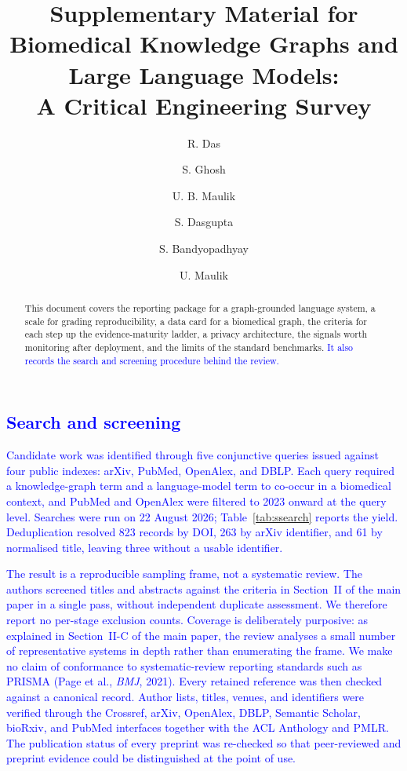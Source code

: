 \documentclass[10pt,a4paper]{article}
\title{Supplementary Material for\\[4pt]
\large Biomedical Knowledge Graphs and Large Language Models:\\A Critical Engineering Survey}
\author{R. Das \and S. Ghosh \and U. B. Maulik \and S. Dasgupta \and S. Bandyopadhyay  \and U. Maulik }
\date{}
\newcommand{\rev}[1]{\textcolor{blue}{#1}}
\newcommand{\rev}[1]{#1}
\begin{document}
\maketitle

\begin{abstract}
\noindent This document covers the reporting package for a graph-grounded language system, a scale
for grading reproducibility, a data card for a biomedical graph, the criteria for each step up the
evidence-maturity ladder, a privacy architecture, the signals worth monitoring after deployment,
and the limits of the standard benchmarks.
\rev{It also records the search and screening procedure behind the review.}
\end{abstract}

\rev{\section{Search and screening}}
\label{s:search}

\rev{Candidate work was identified through five conjunctive queries issued against four public
indexes: arXiv, PubMed, OpenAlex, and DBLP. Each query required a knowledge-graph term and a
language-model term to co-occur in a biomedical context, and PubMed and OpenAlex were filtered to
2023 onward at the query level. Searches were run on 22 August 2026;
Table~\ref{tab:ssearch} reports the yield. Deduplication resolved 823 records by DOI, 263 by arXiv
identifier, and 61 by normalised title, leaving three without a usable identifier.}

\rev{The result is a reproducible sampling frame, not a systematic review. The authors screened
titles and abstracts against the criteria in Section~II of the main paper in a single pass, without
independent duplicate assessment. We therefore report no per-stage exclusion counts. Coverage is
deliberately purposive: as explained in Section~II-C of the main paper, the review analyses a small
number of representative systems in depth rather than enumerating the frame. We make no claim of
conformance to systematic-review reporting standards such as PRISMA (Page et al., \emph{BMJ}, 2021).
Every retained reference was then checked against a canonical record. Author lists, titles, venues,
and identifiers were verified through the Crossref, arXiv, OpenAlex, DBLP, Semantic Scholar,
bioRxiv, and PubMed interfaces together with the ACL Anthology and PMLR. The publication status of
every preprint was re-checked so that peer-reviewed and preprint evidence could be distinguished at
the point of use.}
\end{document}
